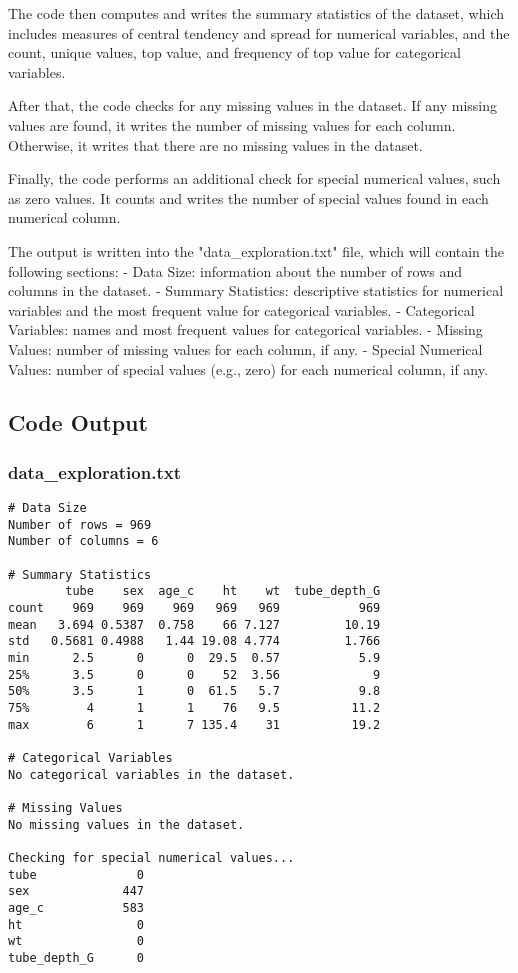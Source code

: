 \documentclass[11pt]{article}
\begin{document}
The code then computes and writes the summary statistics of the dataset, which includes measures of central tendency and spread for numerical variables, and the count, unique values, top value, and frequency of top value for categorical variables.

After that, the code checks for any missing values in the dataset. If any missing values are found, it writes the number of missing values for each column. Otherwise, it writes that there are no missing values in the dataset.

Finally, the code performs an additional check for special numerical values, such as zero values. It counts and writes the number of special values found in each numerical column.

The output is written into the "data\_exploration.txt" file, which will contain the following sections:
- Data Size: information about the number of rows and columns in the dataset.
- Summary Statistics: descriptive statistics for numerical variables and the most frequent value for categorical variables.
- Categorical Variables: names and most frequent values for categorical variables.
- Missing Values: number of missing values for each column, if any.
- Special Numerical Values: number of special values (e.g., zero) for each numerical column, if any.

\subsection{Code Output}

\subsubsection*{data\_exploration.txt}

\begin{Verbatim}[tabsize=4]
# Data Size
Number of rows = 969
Number of columns = 6

# Summary Statistics
        tube    sex  age_c    ht    wt  tube_depth_G
count    969    969    969   969   969           969
mean   3.694 0.5387  0.758    66 7.127         10.19
std   0.5681 0.4988   1.44 19.08 4.774         1.766
min      2.5      0      0  29.5  0.57           5.9
25%      3.5      0      0    52  3.56             9
50%      3.5      1      0  61.5   5.7           9.8
75%        4      1      1    76   9.5          11.2
max        6      1      7 135.4    31          19.2

# Categorical Variables
No categorical variables in the dataset.

# Missing Values
No missing values in the dataset.

Checking for special numerical values...
tube              0
sex             447
age_c           583
ht                0
wt                0
tube_depth_G      0
\end{Verbatim}
\end{document}

